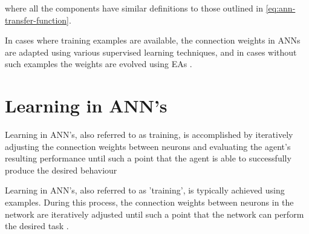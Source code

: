 where all the components have similar definitions to those outlined in \ref{eq:ann-transfer-function}.


In cases where training examples are available, the connection weights in ANNs are adapted using various supervised learning techniques, and in cases without such examples the weights are evolved using EAs \cite{dayhoff2001artificial,RefWorks:1}.




\section{Learning in ANN's}

Learning in ANN's, also referred to as training, is accomplished by iteratively adjusting the connection weights between neurons and evaluating the agent's resulting performance until such a point that the agent is able to successfully produce the desired behaviour

Learning in ANN's, also referred to as 'training', is typically achieved using examples. During this process, the connection weights between neurons in the network are iteratively adjusted until such a point that the network can perform the desired task \cite{XinYao1999}.



